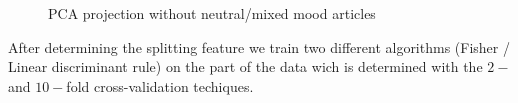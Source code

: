 \begin{figure}[h!]
\begin{minipage}[h]{0.45\linewidth}
	\caption{PCA projection without neutral/mixed mood articles}
	\label{fig:pca_without_mixed}
	\end{minipage}
\end{figure}

After determining the splitting feature  we train two different algorithms  (Fisher / Linear discriminant rule) on the part of the data wich is determined with the $ 2- $ and  $10-$fold cross-validation techiques. 


